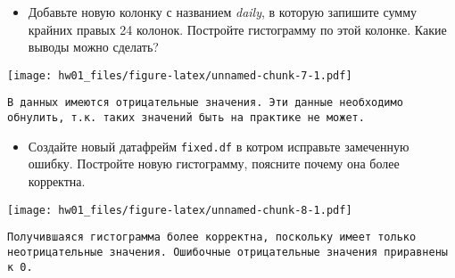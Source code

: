 \documentclass[]{article}
\newenvironment{Shaded}{\begin{snugshade}}{\end{snugshade}}
\newcommand{\KeywordTok}[1]{\textcolor[rgb]{0.13,0.29,0.53}{\textbf{#1}}}
\newcommand{\DataTypeTok}[1]{\textcolor[rgb]{0.13,0.29,0.53}{#1}}
\newcommand{\DecValTok}[1]{\textcolor[rgb]{0.00,0.00,0.81}{#1}}
\newcommand{\StringTok}[1]{\textcolor[rgb]{0.31,0.60,0.02}{#1}}
\newcommand{\OperatorTok}[1]{\textcolor[rgb]{0.81,0.36,0.00}{\textbf{#1}}}
\newcommand{\NormalTok}[1]{#1}
\providecommand{\tightlist}{%
  \setlength{\itemsep}{0pt}\setlength{\parskip}{0pt}}
\begin{document}
\begin{itemize}
\tightlist
\item
  Добавьте новую колонку с названием \emph{daily}, в которую запишите
  сумму крайних правых 24 колонок. Постройте гистограмму по этой
  колонке. Какие выводы можно сделать?
\end{itemize}

\begin{Shaded}
\end{Shaded}

\texttt{[image: hw01\_files/figure-latex/unnamed-chunk-7-1.pdf]}

\begin{verbatim}
В данных имеются отрицательные значения. Эти данные необходимо обнулить, т.к. таких значений быть на практике не может.
\end{verbatim}

\begin{itemize}
\tightlist
\item
  Создайте новый датафрейм \texttt{fixed.df} в котром исправьте
  замеченную ошибку. Постройте новую гистограмму, поясните почему она
  более корректна.
\end{itemize}

\begin{Shaded}
\end{Shaded}

\texttt{[image: hw01\_files/figure-latex/unnamed-chunk-8-1.pdf]}

\begin{verbatim}
Получившаяся гистограмма более корректна, поскольку имеет только неотрицательные значения. Ошибочные отрицательные значения приравнены к 0.
\end{verbatim}
\end{document}
